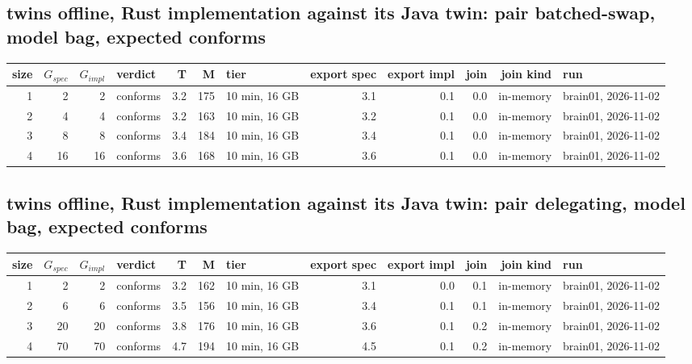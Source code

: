 \documentclass[10pt]{article}
\begin{document}
\subsection*{twins offline, Rust implementation against its Java twin: pair \textsf{batched-swap}, model bag, expected conforms}
\begin{longtable}{@{}rrrlrrlrrrrl@{}}
\toprule
size & $G_{\mathit{spec}}$ & $G_{\mathit{impl}}$ & verdict & T & M & tier & export spec & export impl & join & join kind & run \\
\midrule
\endhead
\color{red} 1 & 2 & 2 & conforms & 3.2 & 175 & 10 min, 16 GB & 3.1 & 0.1 & 0.0 & in-memory & brain01, 2026-11-02 \\
\color{red} 2 & 4 & 4 & conforms & 3.2 & 163 & 10 min, 16 GB & 3.2 & 0.1 & 0.0 & in-memory & brain01, 2026-11-02 \\
\color{red} 3 & 8 & 8 & conforms & 3.4 & 184 & 10 min, 16 GB & 3.4 & 0.1 & 0.0 & in-memory & brain01, 2026-11-02 \\
\color{red} 4 & 16 & 16 & conforms & 3.6 & 168 & 10 min, 16 GB & 3.6 & 0.1 & 0.0 & in-memory & brain01, 2026-11-02 \\
\bottomrule
\end{longtable}
\subsection*{twins offline, Rust implementation against its Java twin: pair \textsf{delegating}, model bag, expected conforms}
\begin{longtable}{@{}rrrlrrlrrrrl@{}}
\toprule
size & $G_{\mathit{spec}}$ & $G_{\mathit{impl}}$ & verdict & T & M & tier & export spec & export impl & join & join kind & run \\
\midrule
\endhead
\color{red} 1 & 2 & 2 & conforms & 3.2 & 162 & 10 min, 16 GB & 3.1 & 0.0 & 0.1 & in-memory & brain01, 2026-11-02 \\
\color{red} 2 & 6 & 6 & conforms & 3.5 & 156 & 10 min, 16 GB & 3.4 & 0.1 & 0.1 & in-memory & brain01, 2026-11-02 \\
\color{red} 3 & 20 & 20 & conforms & 3.8 & 176 & 10 min, 16 GB & 3.6 & 0.1 & 0.2 & in-memory & brain01, 2026-11-02 \\
\color{red} 4 & 70 & 70 & conforms & 4.7 & 194 & 10 min, 16 GB & 4.5 & 0.1 & 0.2 & in-memory & brain01, 2026-11-02 \\
\bottomrule
\end{longtable}
\end{document}
